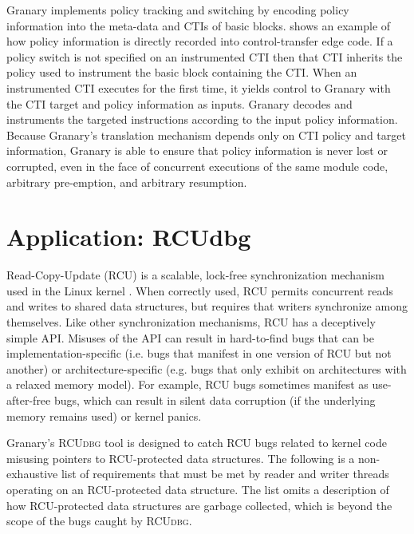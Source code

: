 \documentclass[preprint]{sigplanconf}
\newcommand{\toolname}[1]{{\scshape #1}}
\begin{document}
Granary implements policy tracking and switching by encoding policy information into the meta-data and CTIs of basic blocks.  shows an example of how policy information is directly recorded into control-transfer edge code. If a policy switch is not specified on an instrumented CTI then that CTI inherits the policy used to instrument the basic block containing the CTI. When an instrumented CTI executes for the first time, it yields control to Granary with the CTI target and policy information as inputs. Granary decodes and instruments the targeted instructions according to the input policy information. Because Granary's translation mechanism depends only on CTI policy and target information, Granary is able to ensure that policy information is never lost or corrupted, even in the face of concurrent executions of the same module code, arbitrary pre-emption, and arbitrary resumption.




\section{Application: RCUdbg}\label{sec:rcudbg}

Read-Copy-Update (RCU) is a scalable, lock-free synchronization mechanism used in the Linux kernel \cite{RCU,RCUInLinux}. When correctly used, RCU permits concurrent reads and writes to shared data structures, but requires that writers synchronize among themselves. Like other synchronization mechanisms, RCU has a deceptively simple API. Misuses of the API can result in hard-to-find bugs that can be implementation-specific (i.e. bugs that manifest in one version of RCU but not another) or architecture-specific (e.g. bugs that only exhibit on architectures with a relaxed memory model). For example, RCU bugs sometimes manifest as use-after-free bugs, which can result in silent data corruption (if the underlying memory remains used) or kernel panics. 




Granary's \toolname{RCUdbg} tool is designed to catch RCU bugs related to kernel code misusing pointers to RCU-protected data structures. The following is a non-exhaustive list of requirements that must be met by reader and writer threads operating on an RCU-protected data structure. The list omits a description of how RCU-protected data structures are garbage collected, which is beyond the scope of the bugs caught by \toolname{RCUdbg}.
\end{document}
